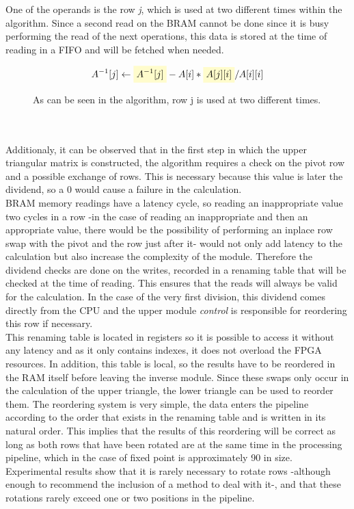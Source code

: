 One of the operands is the row \textit{j}, which is used at two different times within the algorithm. Since a second read on the BRAM cannot be done since it is busy performing the read of the next operations, this data is stored at the time of reading in a FIFO and will be fetched when needed.
\newcommand{\highlight}[1]{%
  \colorbox{yellow!20}{$\displaystyle#1$}}
\begin{figure}[h!]
\[A^{-1}[j] \gets \highlight{A^{-1}[j]}-A[i]*\highlight{A[j][i]}/A[i][i]\]
\caption{As can be seen in the algorithm, row j is used at two different times.}
\end{figure}
\\
\\
Additionaly, it can be observed that in the first step in which the upper triangular matrix is constructed, the algorithm requires a check on the pivot row and a possible exchange of rows. This is necessary because this value is later the dividend, so a 0 would cause a failure in the calculation.
\\
BRAM memory readings have a latency cycle, so reading an inappropriate value two cycles in a row -in the case of reading an inappropriate and then an appropriate value, there would be the possibility of performing an inplace row swap with the pivot and the row just after it- would not only add latency to the calculation but also increase the complexity of the module. Therefore the dividend checks are done on the writes, recorded in a renaming table that will be checked at the time of reading. This ensures that the reads will always be valid for the calculation. In the case of the very first division, this dividend comes directly from the CPU and the upper module \textit{control} is responsible for reordering this row if necessary.
\\
This renaming table is located in registers so it is possible to access it without any latency and as it only contains indexes, it does not overload the FPGA resources. In addition, this table is local, so the results have to be reordered in the RAM itself before leaving the inverse module. Since these swaps only occur in the calculation of the upper triangle, the lower triangle can be used to reorder them. The reordering system is very simple, the data enters the pipeline according to the order that exists in the renaming table and is written in its natural order. This implies that the results of this reordering will be correct as long as both rows that have been rotated are at the same time in the processing pipeline, which in the case of fixed point is approximately 90 in size. Experimental results show that it is rarely necessary to rotate rows -although enough to recommend the inclusion of a method to deal with it-, and that these rotations rarely exceed one or two positions in the pipeline.
